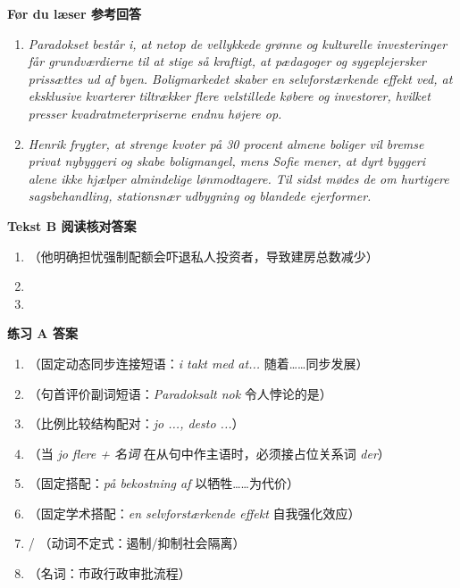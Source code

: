 \begin{answerbox}
\textbf{Før du læser 参考回答}
\begin{enumerate}
  \item \textit{Paradokset består i, at netop de vellykkede grønne og kulturelle investeringer får grundværdierne til at stige så kraftigt, at pædagoger og sygeplejersker prissættes ud af byen. Boligmarkedet skaber en selvforstærkende effekt ved, at eksklusive kvarterer tiltrækker flere velstillede købere og investorer, hvilket presser kvadratmeterpriserne endnu højere op.}
  \item \textit{Henrik frygter, at strenge kvoter på 30 procent almene boliger vil bremse privat nybyggeri og skabe boligmangel, mens Sofie mener, at dyrt byggeri alene ikke hjælper almindelige lønmodtagere. Til sidst mødes de om hurtigere sagsbehandling, stationsnær udbygning og blandede ejerformer.}
\end{enumerate}

\textbf{Tekst B 阅读核对答案}
\begin{enumerate}
  \item {}（他明确担忧强制配额会吓退私人投资者，导致建房总数减少）
  \item {}
  \item {}
\end{enumerate}

\textbf{练习 A 答案}
\begin{enumerate}
  \item {}（固定动态同步连接短语：\textit{i takt med at...} 随着……同步发展）
  \item {}（句首评价副词短语：\textit{Paradoksalt nok} 令人悖论的是）
  \item {}（比例比较结构配对：\textit{jo ..., desto ...}）
  \item {}（当 \textit{jo flere + 名词} 在从句中作主语时，必须接占位关系词 \textit{der}）
  \item {}（固定搭配：\textit{på bekostning af} 以牺牲……为代价）
  \item {}（固定学术搭配：\textit{en selvforstærkende effekt} 自我强化效应）
  \item {} / （动词不定式：遏制/抑制社会隔离）
  \item {}（名词：市政行政审批流程）
\end{enumerate}


\end{answerbox}
